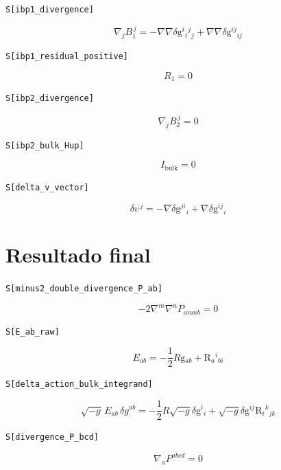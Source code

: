 \noindent\texttt{S[ibp1\_divergence]}

\[
\boxed{\nabla_j B_1^{\,j} = -\nabla\nabla\delta \mathrm{g}{}^{i}{}_{i}{}^{j}{}_{j} + \nabla\nabla\delta \mathrm{g}{}^{ij}{}_{ij}}
\]


\noindent\texttt{S[ibp1\_residual\_positive]}

\[
\boxed{R_1 = 0}
\]


\noindent\texttt{S[ibp2\_divergence]}

\[
\boxed{\nabla_j B_2^{\,j} = 0}
\]


\noindent\texttt{S[ibp2\_bulk\_Hup]}

\[
\boxed{I_{\mathrm{bulk}} = 0}
\]


\noindent\texttt{S[delta\_v\_vector]}

\[
\boxed{\delta v^{\,j} = -\nabla\delta \mathrm{g}{}^{ji}{}_{i} + \nabla\delta \mathrm{g}{}^{ij}{}_{i}}
\]


\section*{Resultado final}

\noindent\texttt{S[minus2\_double\_divergence\_P\_ab]}

\[
\boxed{-2\nabla^m\nabla^n P_{amnb} = 0}
\]


\noindent\texttt{S[E\_ab\_raw]}

\[
\boxed{E_{ab} = -\frac{1}{2}R\mathrm{g}{}_{ab} + \mathrm{R}{}_{a}{}^{i}{}_{bi}}
\]


\noindent\texttt{S[delta\_action\_bulk\_integrand]}

\[
\boxed{\sqrt{-g}\,E_{ab}\,\delta g^{ab} = -\frac{1}{2}R\sqrt{-g}\delta \mathrm{g}{}^{i}{}_{i} + \sqrt{-g}\delta \mathrm{g}{}^{ij}\mathrm{R}{}_{i}{}^{k}{}_{jk}}
\]


\noindent\texttt{S[divergence\_P\_bcd]}

\[
\boxed{\nabla_a P^{abcd} = 0}
\]
